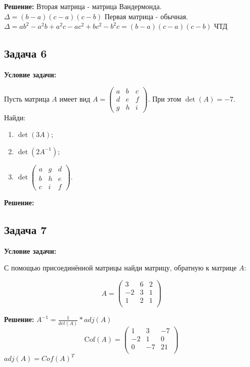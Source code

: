 \documentclass[a4paper,12pt]{article}
\begin{document}
\textbf{Решение:}
Вторая матрица - матрица Вандермонда. $\Delta = (b-a)(c-a)(c-b)$
Первая матрица - обычная. $\Delta = ab^2 - a^2b + a^2c - ac^2 + bc^2 - b^2c = (b - a)(c - a)(c - b)$ ЧТД

\vspace{1cm}

\subsection{Задача 6}

\textbf{Условие задачи:}

Пусть матрица \( A \) имеет вид \( A = \begin{pmatrix} a & b & c \\ d & e & f \\ g & h & i \end{pmatrix} \). При этом \( \det(A) = -7 \). Найди:

\begin{enumerate}
    \item \( \det(3A) \);
    \item \( \det(2A^{-1}) \);
    \item \( \det\begin{pmatrix} a & g & d \\ b & h & e \\ c & i & f \end{pmatrix} \).
\end{enumerate}

\textbf{Решение:}


\vspace{1cm}

\subsection{Задача 7}

\textbf{Условие задачи:}

С помощью присоединённой матрицы найди матрицу, обратную к матрице \( A \):

\[
A = \begin{pmatrix}
3 & 6 & 2 \\
-2 & 3 & 1 \\
1 & 2 & 1 \\
\end{pmatrix}
\]

\textbf{Решение:}
$A^{-1}=\frac{1}{det(A)}*adj(A)$
\[
\text{Cof}(A) = \begin{pmatrix}
1 & 3 & -7 \\
-2 & 1 & 0 \\
0 & -7 & 21 \\
\end{pmatrix}
\]
$adj(A) = Cof(A)^T$
\end{document}
